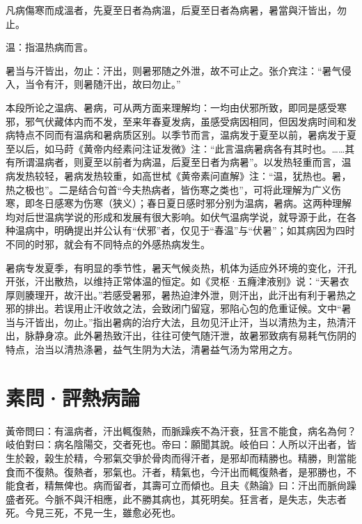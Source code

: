 \documentclass[draft,12pt]{ctexbook}
\begin{document}

\begin{yuanwen}
凡病傷寒而成溫者，先夏至日者為病溫，后夏至日者為病暑，暑當與汗皆出，勿止。
\end{yuanwen}


\begin{jiaozhu}
	\item 温：指温热病而言。
	\item 暑当与汗皆出，勿止：汗出，则暑邪随之外泄，故不可止之。张介宾注：“暑气侵入，当令有汗，则暑随汗出，故曰勿止。”
\end{jiaozhu}


本段所论之温病、暑病，可从两方面来理解均：一均由伏邪所致，即同是感受寒邪，邪气伏藏体内而不发，至来年春夏发病，虽感受病因相同，但因发病时间和发病特点不同而有温病和暑病质区别。以季节而言，温病发于夏至以前，暑病发于夏至以后，如马莳《黄帝内经素问注证发微》注：“此言温病暑病各有其时也。……其有所谓温病者，则夏至以前者为病温，后夏至日者为病暑”。以发热轻重而言，温病发热较轻，暑病发热较重，如高世栻《黄帝素问直解》注：“温，犹热也。暑，热之极也”。二是结合句首“今夫热病者，皆伤寒之类也”，可将此理解为广义伤寒，即冬日感寒为伤寒（狭义）；春日夏日感时邪分别为温病，暑病。这两种理解均对后世温病学说的形成和发展有很大影响。如伏气温病学说，就导源于此，在各种温病中，明确提出并公认有“伏邪”者，仅见于“春温”与“伏暑”；如其病因为四时不同的时邪，就会有不同特点的外感热病发生。



暑病专发夏季，有明显的季节性，暑天气候炎热，机体为适应外环境的变化，汗孔开张，汗出散热，以维持正常体温的恒定。如《灵枢·五癃津液别》说：“天暑衣厚则腠理开，故汗出。”若感受暑邪，暑热迫津外泄，则汗出，此汗出有利于暑热之邪的排出。若误用止汗收敛之法，会致闭门留寇，邪陷心包的危重证候。文中“暑当与汗皆出，勿止。”指出暑病的治疗大法，且勿见汗止汗，当以清热为主，热清汗出，脉静身凉。此外暑热致汗出，往往可使气随汗泄，故暑邪致病有易耗气伤阴的特点，治当以清热涤暑，益气生阴为大法，清暑益气汤为常用之方。

\section{素問·評熱病論}%


\begin{yuanwen}
黃帝問曰：有溫病者，汗出輒復熱，而脈躁疾不為汗衰，狂言不能食，病名為何？岐伯對曰：病名陰陽交，交者死也。帝曰：願聞其說。岐伯曰：人所以汗出者，皆生於穀，榖生於精，今邪氣交爭於骨肉而得汗者，是邪却而精勝也。精勝，則當能食而不復熱。復熱者，邪氣也。汗者，精氣也，今汗出而輒復熱者，是邪勝也，不能食者，精無俾也。病而留者，其壽可立而傾也。且夫《熱論》曰：汗出而脈尙躁盛者死。今脈不與汗相應，此不勝其病也，其死明矣。狂言者，是失志，失志者死。今見三死，不見一生，雖愈必死也。
\end{yuanwen}
\end{document}
